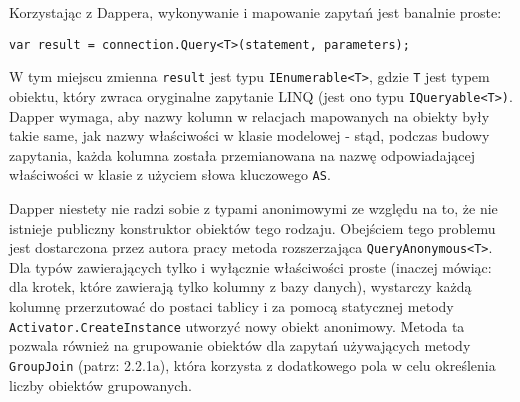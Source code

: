 Korzystając z Dappera, wykonywanie i mapowanie zapytań jest banalnie proste:

\begin{lstlisting}
var result = connection.Query<T>(statement, parameters);
\end{lstlisting}

W tym miejscu zmienna \texttt{result} jest typu \texttt{IEnumerable<T>}, gdzie \texttt{T} jest typem obiektu, który zwraca oryginalne zapytanie LINQ (jest ono typu \texttt{IQueryable<T>)}. Dapper wymaga, aby nazwy kolumn w relacjach mapowanych na obiekty były takie same, jak nazwy właściwości w klasie modelowej - stąd, podczas budowy zapytania, każda kolumna została przemianowana na nazwę odpowiadającej właściwości w klasie z użyciem słowa kluczowego \texttt{AS}.

Dapper niestety nie radzi sobie z typami anonimowymi ze względu na to, że nie istnieje publiczny konstruktor obiektów tego rodzaju. Obejściem tego problemu jest dostarczona przez autora pracy metoda rozszerzająca \texttt{QueryAnonymous<T>}. Dla typów zawierających tylko i wyłącznie właściwości proste (inaczej mówiąc: dla krotek, które zawierają tylko kolumny z bazy danych), wystarczy każdą kolumnę przerzutować do postaci tablicy i za pomocą statycznej metody \texttt{Activator.CreateInstance} utworzyć nowy obiekt anonimowy. Metoda ta pozwala również na grupowanie obiektów dla zapytań używających metody \texttt{GroupJoin} (patrz: 2.2.1a), która korzysta z dodatkowego pola w celu określenia liczby obiektów grupowanych.